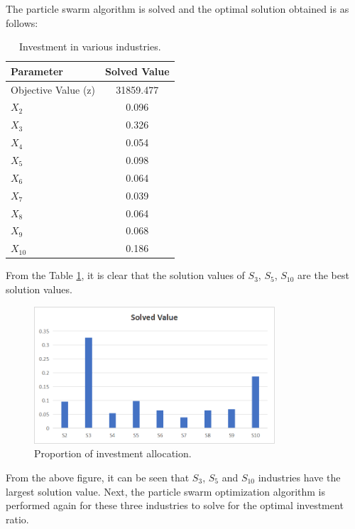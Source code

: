 \documentclass[12pt]{article}  %
\begin{document}
	The particle swarm algorithm is solved and the optimal solution obtained is as follows:
	
	 
	 \begin{table}[H]
	 	\centering
	 	\caption{Investment in various industries.}
	 	\label{resultss}
	 	\begin{tabular}{lc}
	 		\toprule
	 		\textbf{Parameter} & \textbf{Solved Value} \\
	 		\midrule
	 		Objective Value (z) & 31859.477 \\
	 		$X_2$ & 0.096 \\
	 		$X_3$ & 0.326 \\
	 		$X_4$ & 0.054 \\
	 		$X_5$ & 0.098 \\
	 		$X_6$ & 0.064 \\
	 		$X_7$ & 0.039 \\
	 		$X_8$ & 0.064 \\
	 		$X_9$ & 0.068 \\
	 		$X_{10}$ & 0.186 \\
	 		\bottomrule
	 	\end{tabular}
	 \end{table}
	 
	 From the Table \ref{resultss}, it is clear that the solution values of $S_3$, $S_5$, $S_{10}$ are the best solution values.
	 
	 	\begin{figure}[H] %
	 	\centering
	 	\includegraphics[width=0.8\textwidth]{img/q5} %
	 	\caption{Proportion of investment allocation.} %
	 	\label{q5} %
	 \end{figure}
 
	 From the above figure, it can be seen that $S_3$, $S_5$ and $S_{10}$ industries have the largest solution value. Next, the particle swarm optimization algorithm is performed again for these three industries to solve for the optimal investment ratio.
	 
\end{document}
